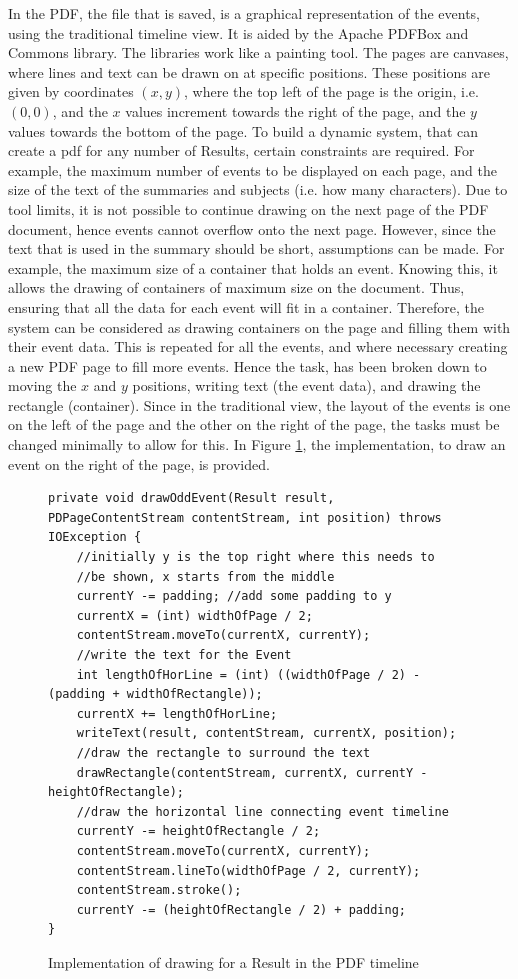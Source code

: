 \par In the PDF, the file that is saved, is a graphical representation of the events, using the traditional timeline view. It is aided by the Apache PDFBox and Commons library. The libraries work like a painting tool. The pages are canvases, where lines and text can be drawn on at specific positions. These positions are given by coordinates $(x,y)$, where the top left of the page is the origin, i.e. $(0,0)$, and the $x$ values increment towards the right of the page, and the $y$ values towards the bottom of the page. To build a dynamic system, that can create a pdf for any number of Results, certain constraints are required. For example, the maximum number of events to be displayed on each page, and the size of the text of the summaries and subjects (i.e. how many characters). Due to tool limits, it is not possible to continue drawing on the next page of the PDF document, hence events cannot overflow onto the next page. However, since the text that is used in the summary should be short, assumptions can be made. For example, the maximum size of a container that holds an event. Knowing this, it allows the drawing of containers of maximum size on the document. Thus, ensuring that all the data for each event will fit in a container. Therefore, the system can be considered as drawing containers on the page and filling them with their event data. This is repeated for all the events, and where necessary creating a new PDF page to fill more events. Hence the task, has been broken down to moving the $x$ and $y$ positions, writing text (the event data), and drawing the rectangle (container). Since in the traditional view, the layout of the events is one on the left of the page and the other on the right of the page, the tasks must be changed minimally to allow for this. In Figure \ref{fig:drawRecImplemented}, the implementation, to draw an event on the right of the page, is provided.

\begin{figure}[H]
\begin{lstlisting}
private void drawOddEvent(Result result, PDPageContentStream contentStream, int position) throws IOException {
	//initially y is the top right where this needs to 
	//be shown, x starts from the middle
	currentY -= padding; //add some padding to y
	currentX = (int) widthOfPage / 2;
	contentStream.moveTo(currentX, currentY);
	//write the text for the Event
	int lengthOfHorLine = (int) ((widthOfPage / 2) - (padding + widthOfRectangle));
	currentX += lengthOfHorLine;
	writeText(result, contentStream, currentX, position);
	//draw the rectangle to surround the text
	drawRectangle(contentStream, currentX, currentY - heightOfRectangle);
	//draw the horizontal line connecting event timeline
	currentY -= heightOfRectangle / 2;
	contentStream.moveTo(currentX, currentY);
	contentStream.lineTo(widthOfPage / 2, currentY);
	contentStream.stroke();
	currentY -= (heightOfRectangle / 2) + padding;
}
\end{lstlisting}
\caption{Implementation of drawing for a Result in the PDF timeline}
\label{fig:drawRecImplemented}
\end{figure}

